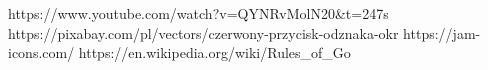 https://www.youtube.com/watch?v=QYNRvMolN20&t=247s
https://pixabay.com/pl/vectors/czerwony-przycisk-odznaka-okr%
https://jam-icons.com/
https://en.wikipedia.org/wiki/Rules_of_Go
